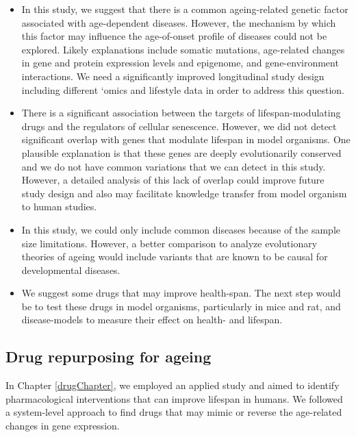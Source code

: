\documentclass[12pt,twoside]{unicam}
\providecommand{\tightlist}{%
  \setlength{\itemsep}{0pt}\setlength{\parskip}{0pt}}
\begin{document}
\begin{itemize}
\tightlist
\item
  In this study, we suggest that there is a common ageing-related genetic factor associated with age-dependent diseases. However, the mechanism by which this factor may influence the age-of-onset profile of diseases could not be explored. Likely explanations include somatic mutations, age-related changes in gene and protein expression levels and epigenome, and gene-environment interactions. We need a significantly improved longitudinal study design including different `omics and lifestyle data in order to address this question.
\item
  There is a significant association between the targets of lifespan-modulating drugs and the regulators of cellular senescence. However, we did not detect significant overlap with genes that modulate lifespan in model organisms. One plausible explanation is that these genes are deeply evolutionarily conserved and we do not have common variations that we can detect in this study. However, a detailed analysis of this lack of overlap could improve future study design and also may facilitate knowledge transfer from model organism to human studies.
\item
  In this study, we could only include common diseases because of the sample size limitations. However, a better comparison to analyze evolutionary theories of ageing would include variants that are known to be causal for developmental diseases.
\item
  We suggest some drugs that may improve health-span. The next step would be to test these drugs in model organisms, particularly in mice and rat, and disease-models to measure their effect on health- and lifespan.
\end{itemize}

\hypertarget{drug-repurposing-for-ageing}{%
\subsection{Drug repurposing for ageing}\label{drug-repurposing-for-ageing}}

In Chapter \ref{drugChapter}, we employed an applied study and aimed to identify pharmacological interventions that can improve lifespan in humans. We followed a system-level approach to find drugs that may mimic or reverse the age-related changes in gene expression.
\end{document}
